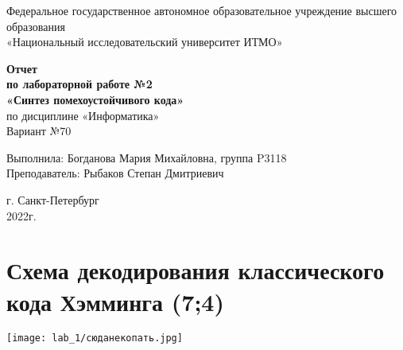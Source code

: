 \documentclass[a4paper]{article}
\begin{document}
\begin{center}
    Федеральное государственное автономное образовательное учреждение высшего образования\\
	«Национальный исследовательский университет ИТМО»
\end{center}
\vspace{1cm}


\begin{center}
    \large \textbf{Отчет}\\
    \textbf{по лабораторной работе №2}\\
    \large \textbf{«Синтез помехоустойчивого кода»}\\
     по дисциплине «Информатика»\\
	\vspace{1cm}
    Вариант №70\\
\end{center}

\vspace{10cm}
\begin{flushright}
  Выполнила: Богданова Мария Михайловна, группа P3118\\
  Преподаватель: Рыбаков Степан Дмитриевич\\
\end{flushright}

\vspace{1cm}
\begin{center}
    г. Санкт-Петербург\\
    2022г.
\end{center}
\newpage
\tableofcontents
\newpage
\section{Схема декодирования классического кода Хэмминга (7;4)}
\texttt{[image: lab\_1/сюданекопать.jpg]}
\newpage
\end{document}
